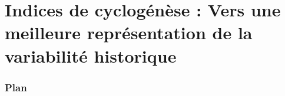 \documentclass[aspectratio=169, usepdftitle=false, xcolor={dvipsnames}, 9pt,table]{beamer}
\begin{document}
\section[Indices de cyclogénèse]{Indices de cyclogénèse : Vers une meilleure représentation de la variabilité historique}
%
\begin{frame}[c]
    \frametitle{Plan}
    \addtocounter{framesinsection}{-1}
\end{frame}


\end{document}
